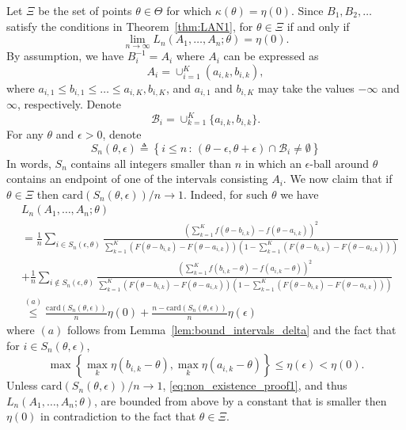 \documentclass[letterpaper, 11pt]{IEEEtran}      %
\newcommand{\card}{\mathrm{card}}
\begin{document}
Let $\Xi$ be the set of points $\theta \in \Theta$ for which $\kappa(\theta) = \eta(0)$. 
%
Since $B_1,B_2,\ldots$ satisfy the conditions in Theorem~\ref{thm:LAN1}, for $\theta \in \Xi$ if and only if
\begin{equation}
\label{eq:non_existence_proof}
\lim_{n\to \infty} L_n(A_1,\ldots,A_n;\theta) = \eta(0). 
\end{equation}
By assumption, we have $B_i^{-1} = A_i$ where $A_i$ can be expressed as
\[
A_i = \cup_{i=1}^K (a_{i,k},b_{i,k}), 
\]
where $a_{i,1} \leq b_{i,1} \leq \ldots \leq a_{i,K}, b_{i,K}$, and $a_{i,1}$ and $b_{i,K}$ may take the values $-\infty$ and $\infty$, respectively. Denote
\[
\mathcal B_i = \cup_{k=1}^{K}\{a_{i,k},b_{i,k}\}.
\]
For any $\theta$ and $\epsilon>0$, denote 
\[
S_n(\theta, \epsilon) \triangleq \left\{ i\leq n \,:\, (\theta-\epsilon,\theta+\epsilon) \cap \mathcal B_i \neq \emptyset \right\}
\]
In words, $S_n$ contains all integers smaller than $n$ in which an $\epsilon$-ball around $\theta$ contains an endpoint of one of the intervals consisting $A_i$. 
%
We now claim that 
if $\theta \in \Xi$ then $\card(S_n(\theta, \epsilon))/n \to 1$. Indeed, for such $\theta$ we have
\begin{align}
& L_n(A_1,\ldots,A_n; \theta) \nonumber \\
& = \frac{1}{n} \sum_{i \in S_n(\epsilon,\theta)}  
\frac{ \left(\sum_{k=1}^{K}  f(\theta - b_{i,k})- f(\theta - a_{i,k}) \right)^2}{ \sum_{k=1}^{K} \left( F(\theta - b_{i,k})- F(\theta - a_{i,k}) \right) \left(1-\sum_{k=1}^{K} \left( F(\theta - b_{i,k})- F(\theta - a_{i,k}) \right)\right)} \nonumber \\
& 
+ \frac{1}{n}\sum_{i \notin S_n(\epsilon,\theta) } \frac{ \left(\sum_{k=1}^{K}  f(b_{i,k}-\theta) - f(a_{i,k}-\theta) \right)^2} { \sum_{k=1}^{K} \left( F(\theta - b_{i,k})- F(\theta - a_{i,k}) \right) \left(1-\sum_{k=1}^{K} \left( F(\theta - b_{i,k})- F(\theta - a_{i,k}) \right)\right)} \nonumber \\
& \overset{(a)}{\leq}
\frac{\card\left(S_n(\theta,\epsilon)\right)}{n} \eta(0) + \frac{n-\card\left(S_n(\theta,\epsilon) \right) }{n} \eta(\epsilon) 
 \label{eq:non_existence_proof1}
\end{align}
where $(a)$ follows from Lemma~\ref{lem:bound_intervals_delta} and the fact that for $i \in S_n(\theta, \epsilon)$, 
\[
\max\left\{ \max_k \eta(b_{i,k}-\theta) , \max_k \eta(a_{i,k}-\theta)  \right\} \leq \eta(\epsilon) < \eta(0). 
\]
Unless  $\card \left(S_n(\theta, \epsilon) \right)/n \to 1$, \eqref{eq:non_existence_proof1}, and thus $L_n(A_1,\ldots,A_n ; \theta)$, are bounded from above by a constant that is smaller then $\eta(0)$ in contradiction to the fact that $\theta \in \Xi$. \par
\end{document}
